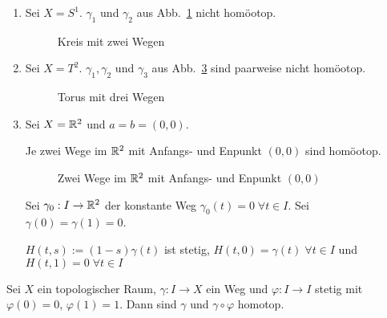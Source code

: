\begin{beispiel}
    \begin{enumerate}[label=\arabic*)]
        \item Sei $X = S^1$. $\gamma_1$ und $\gamma_2$ aus 
              Abb.~\ref{fig:circle-two-paths} nicht homöotop.
              \begin{figure}
                \centering
                
                \caption{Kreis mit zwei Wegen}
                \label{fig:circle-two-paths}
              \end{figure}
        \item Sei $X = T^2$. $\gamma_1, \gamma_2$ und $\gamma_3$
              aus Abb.~\ref{fig:torus-three-paths} sind paarweise
              nicht homöotop.
              \begin{figure}
                \centering
                
                \caption{Torus mit drei Wegen}
                \label{fig:torus-three-paths}
              \end{figure}
        \item Sei $X = \mathbb{R}^2$ und $a=b=(0,0)$. 

              Je zwei Wege im $\mathbb{R}^2$ mit Anfangs- und Enpunkt $(0,0)$
              sind homöotop.

              \begin{figure}
                \centering
                
                \caption{Zwei Wege im $\mathbb{R}^2$ mit Anfangs- und Enpunkt $(0,0)$}
                \label{fig:torus-three-paths}
              \end{figure}

              Sei $\gamma_0: I \rightarrow \mathbb{R}^2$ der konstante Weg
              $\gamma_0(t) = 0 \; \forall t \in I$. Sei
              $\gamma(0) = \gamma(1) = 0$.

              $H(t,s) := (1-s) \gamma(t)$ ist stetig, 
              $H(t,0) = \gamma(t)\; \forall t \in I$ und
              $H(t,1) = 0 \; \forall t \in I$
    \end{enumerate}
\end{beispiel}

\begin{korollar}\label{kor:homotope-wege}
    Sei $X$ ein topologischer Raum, $\gamma: I \rightarrow X$ ein 
    Weg und $\varphi: I \rightarrow I$ stetig mit $\varphi(0) = 0$,
    $\varphi(1) = 1$. Dann sind $\gamma$ und $\gamma \circ \varphi$
    homotop.
\end{korollar}

